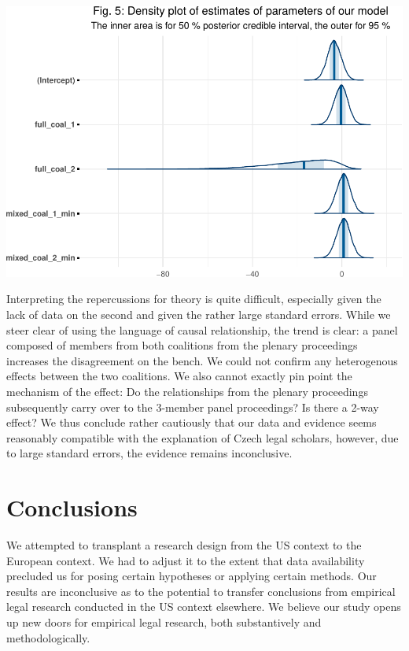 \documentclass[
  11pt,
]{article}
\begin{document}
\vspace{25pt}

\includegraphics{dissents_article_anonymised_files/figure-latex/interval_coalition-1.pdf}
\vspace{25pt}

Interpreting the repercussions for theory is quite difficult, especially
given the lack of data on the second and given the rather large standard
errors. While we steer clear of using the language of causal
relationship, the trend is clear: a panel composed of members from both
coalitions from the plenary proceedings increases the disagreement on
the bench. We could not confirm any heterogenous effects between the two
coalitions. We also cannot exactly pin point the mechanism of the
effect: Do the relationships from the plenary proceedings subsequently
carry over to the 3-member panel proceedings? Is there a 2-way effect?
We thus conclude rather cautiously that our data and evidence seems
reasonably compatible with the explanation of Czech legal scholars,
however, due to large standard errors, the evidence remains
inconclusive.

\hypertarget{conclusions}{%
\section{Conclusions}\label{conclusions}}

We attempted to transplant a research design from the US context to the
European context. We had to adjust it to the extent that data
availability precluded us for posing certain hypotheses or applying
certain methods. Our results are inconclusive as to the potential to
transfer conclusions from empirical legal research conducted in the US
context elsewhere. We believe our study opens up new doors for empirical
legal research, both substantively and methodologically.
\end{document}
